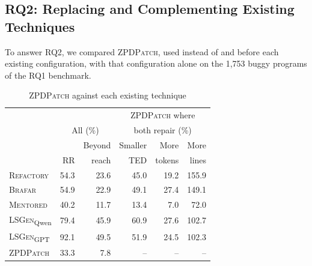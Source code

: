 \documentclass[conference]{IEEEtran}
\begin{document}
\subsection{RQ2: Replacing and Complementing Existing Techniques}
\label{sec:rq-comparison}

To answer RQ2, we compared \textsc{ZPDPatch}, used instead of and before each existing configuration, with that configuration alone on the 1,753 buggy programs of the RQ1 benchmark.

\begin{table}[h]
\caption{\textsc{ZPDPatch} against each existing technique}
\label{tab:rq2}
\centering\footnotesize
\begin{tabular}{@{}l||rr|rrr@{}}
\toprule
 & \multicolumn{2}{c|}{} & \multicolumn{3}{c}{\textsc{ZPDPatch} where} \\
 & \multicolumn{2}{c|}{All (\%)} & \multicolumn{3}{c}{both repair (\%)} \\
 & & Beyond & Smaller & More & More \\
 & RR & reach & TED & tokens & lines \\
\midrule
\textsc{Refactory} & 54.3 & 23.6 & 45.0 & 19.2 & 155.9 \\
\textsc{Brafar} & 54.9 & 22.9 & 49.1 & 27.4 & 149.1 \\
\textsc{Mentored} & 40.2 & 11.7 & 13.4 & 7.0 & 72.0 \\
\textsc{LSGen}\textsubscript{Qwen} & 79.4 & 45.9 & 60.9 & 27.6 & 102.7 \\
\textsc{LSGen}\textsubscript{GPT} & 92.1 & 49.5 & 51.9 & 24.5 & 102.3 \\
\midrule
\textsc{ZPDPatch} & 33.3 & 7.8 & -- & -- & -- \\
\bottomrule
\end{tabular}
\end{table}
\end{document}

